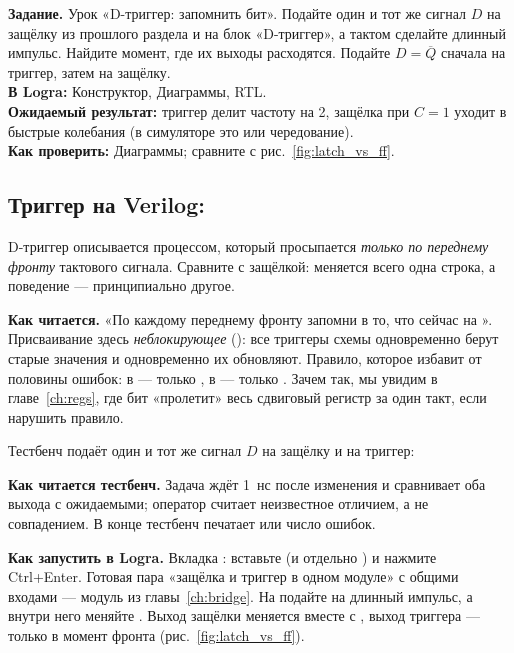 \begin{diybox}
\textbf{Задание.}  Урок «D-триггер: запомнить бит».  Подайте
один и тот же сигнал $D$ на защёлку из прошлого раздела и на блок «D-триггер»,
а тактом сделайте длинный импульс. Найдите момент, где их выходы расходятся.
 Подайте $D=\overline{Q}$ сначала на триггер, затем на защёлку.\\
\textbf{В Logra:} Конструктор, Диаграммы, RTL.\\
\textbf{Ожидаемый результат:} триггер делит частоту на 2, защёлка при $C=1$
уходит в быстрые колебания (в симуляторе это  или чередование).\\
\textbf{Как проверить:} Диаграммы; сравните с рис.~\ref{fig:latch_vs_ff}.
\end{diybox}

\subsection{Триггер на Verilog: }
\label{sec:ff-dff-v}

D-триггер описывается процессом, который просыпается \emph{только по
переднему фронту} тактового сигнала. Сравните с защёлкой: меняется всего одна
строка, а поведение --- принципиально другое.


\textbf{Как читается.} «По каждому переднему фронту  запомни в
 то, что сейчас на ». Присваивание здесь \emph{неблокирующее}
(\code{<=}): все триггеры схемы одновременно берут старые значения и
одновременно их обновляют. Правило, которое избавит от половины ошибок: в
 --- только \code{<=}, в  --- только
\code{=}. Зачем так, мы увидим в главе~\ref{ch:regs}, где бит «пролетит» весь
сдвиговый регистр за один такт, если нарушить правило.

Тестбенч  подаёт один и тот же сигнал $D$ на защёлку и
на триггер:


\textbf{Как читается тестбенч.} Задача  ждёт 1~нс после изменения и
сравнивает оба выхода с ожидаемыми; оператор \code{!==} считает неизвестное
 отличием, а не совпадением. В конце тестбенч печатает  или
число ошибок.

\textbf{Как запустить в Logra.} Вкладка : вставьте 
(и отдельно ) и нажмите Ctrl+Enter. Готовая пара «защёлка и
триггер в одном модуле» с общими входами --- модуль  из
главы~\ref{ch:bridge}. На  подайте на  длинный
импульс, а внутри него меняйте . Выход защёлки меняется вместе с , выход триггера ---
только в момент фронта (рис.~\ref{fig:latch_vs_ff}).

